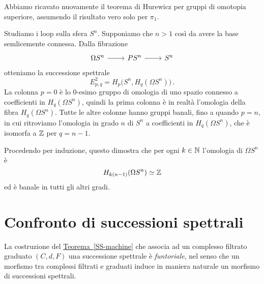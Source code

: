 


	Abbiamo ricavato nuovamente il teorema di Hurewicz
	per gruppi di omotopia superiore,
	assumendo il risultato vero solo per $\pi_{1}$.
	
	\begin{ex}
		Studiamo i loop sulla sfera $S^{n}$.
		Supponiamo che $n > 1$ così da avere la base semlicemente connessa.
		Dalla fibrazione
		\begin{equation*}
			\begin{tikzcd}
				\Omega S^{n} \ar[r] & PS^{n} \ar[r] & S^{n}
			\end{tikzcd}
		\end{equation*}
		otteniamo la successione spettrale
		\begin{equation*}
			E^{2}_{p,q} = H_{p}\big(S^{n},H_{q}(\Omega S^{n}) \big)\,.
		\end{equation*}
		La colonna $p=0$ è lo $0$-esimo gruppo di omologia di uno spazio connesso
		a coefficienti in $H_{q}(\Omega S^{n})$, quindi la prima colonna è in realtà
		l'omologia della fibra $H_{q}(\Omega S^{n})$. 
		Tutte le altre colonne hanno gruppi banali, fino a quando
		$p = n$, in cui ritroviamo l'omologia in grado $n$ di $S^{n}$
		a coefficienti in $H_{q}(\Omega S^{n})$, che è isomorfa a ${\mathbb Z}$ per $q=n-1$.
		
		Procedendo per induzione, questo dimostra che per ogni $k \in {\mathbb N}$
		l'omologia di $\Omega S^{n}$ è
		\begin{equation*}
			H_{k(n-1)}(\Omega S^{n}) \simeq {\mathbb Z}
		\end{equation*}
		ed è banale in tutti gli altri gradi.
	\end{ex}
	
	
	
	\section{Confronto di successioni spettrali}
	
	
	La costruzione del \hyperref[SS-machine]{Teorema~\ref{SS-machine}}
	che associa ad un complesso filtrato graduato $(C,d,F)$ una successione spettrale
	è \emph{funtoriale}, nel senso che un morfismo tra complessi filtrati e graduati
	induce in maniera naturale un morfismo di successioni spettrali.
	
